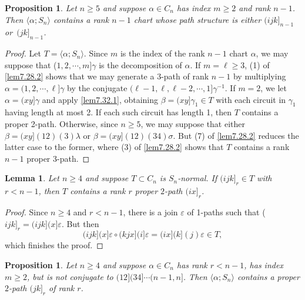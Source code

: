 \documentclass{surv-l}
\numberwithin{equation}{section}
\numberwithin{table}{section}
\numberwithin{figure}{section}
\newtheorem{lemma}[equation]{Lemma}
\newtheorem{proposition}[equation]{Proposition}
\theoremstyle{definition}
\begin{document}
\setcounter{equation}{2}
\begin{proposition}\label{prop7.32.3}
Let $n\geq 5$ and suppose $\alpha\in C_{n}$ has index $m\geq 2$
and rank $n -1$. Then $\langle\alpha;S_{n}\rangle$ contains a rank
$n-1$ chart whose path structure is either $(ijk]_{n-1}$
or~$(jk]_{n-1}$.
\end{proposition}

\begin{proof} Let $T=\langle\alpha;S_{n}\rangle$. Since $m$ is the index
of the rank $n-1$ chart $\alpha$, we may suppose that ($1, 2,
\cdots, m]\gamma$ is the decomposition of $\alpha$. If $m=\ell\geq
3$, (1) of \ref{lem7.28.2} shows that we may generate a 3-path of
rank $n-1$ by multiplying $\alpha=(1,2, \cdots, \ell]\gamma$ by
the conjugate $(\ell-1, \ell, \ell-2, \cdots, 1]\gamma^{-1}$. If
$m=2$, we let $\alpha=(xy]\gamma$ and apply \ref{lem7.32.1},
obtaining $\beta=(xy]\gamma_{1}\in T$ with each circuit in
$\gamma_{1}$ having length at most 2. If each such circuit has
length 1, then $T$ contains a proper 2-path. Otherwise, since $n
\geq 5$, we may suppose that either $\beta=(xy](12)(3)\lambda$ or
$\beta=(xy](12)(34)\sigma$. But (7) of \ref{lem7.28.2} reduces the
latter case to the former, where (3) of \ref{lem7.28.2} shows that
$T$ contains a rank $n -1$ proper 3-path.
\end{proof}

\setcounter{equation}{3}
\begin{lemma}\label{lem7.32.4}
Let $n \geq 4$ and suppose $T\subset C_{n}$ is $S_{n}$-normal. If
$(ijk]_{r}\in T$ with $r<n-1$, then $T$ contains a rank $r$ proper
$2$-path $(ix]_{r}$.
\end{lemma}

\begin{proof} Since $n \geq 4$ and $r<n -1$, there is a join $\varepsilon$
of 1-paths such that ($ijk]_{r}=(ijk](x]\varepsilon$. But then
\[
(ijk](x]\varepsilon\circ (kjx](i]\varepsilon=(ix](k](j)\varepsilon\in T,
\]
which finishes the proof.
\end{proof}

\begin{proposition}\label{prop7.32.5}
Let $n \geq 4$ and suppose $\alpha\in C_{n}$ has rank $r<n -1$,
has index $m\geq 2$, but is not conjugate to $(12](34]\cdots(n-1,
n]$. Then $\langle\alpha;S_{n}\rangle$ contains a proper $2$-path
$(jk]_{r}$ of rank $r$.
\end{proposition}
\end{document}
